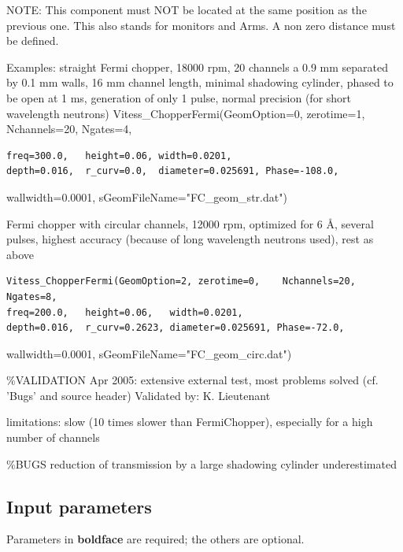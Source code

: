 NOTE: This component must NOT be located at the same position as the previous one. This also stands for monitors and Arms. A non zero distance must be defined.

Examples: straight Fermi chopper, 18000 rpm, 20 channels a 0.9 mm separated by 0.1 mm walls, 16 mm channel length, minimal shadowing cylinder, phased to be open at 1 ms, generation of only 1 pulse, normal precision (for short wavelength neutrons) Vitess\_ChopperFermi(GeomOption=0, zerotime=1, Nchannels=20, Ngates=4,

\begin{verbatim}
freq=300.0,   height=0.06, width=0.0201,
depth=0.016,  r_curv=0.0,  diameter=0.025691, Phase=-108.0,
\end{verbatim}

wallwidth=0.0001, sGeomFileName="FC\_geom\_str.dat")

Fermi chopper with circular channels, 12000 rpm, optimized for 6 \AA{}, several pulses, highest accuracy (because of long wavelength neutrons used), rest as above

\begin{verbatim}
Vitess_ChopperFermi(GeomOption=2, zerotime=0,    Nchannels=20,  Ngates=8,
freq=200.0,   height=0.06,   width=0.0201,
depth=0.016,  r_curv=0.2623, diameter=0.025691, Phase=-72.0,
\end{verbatim}

wallwidth=0.0001, sGeomFileName="FC\_geom\_circ.dat")

\%VALIDATION Apr 2005: extensive external test, most problems solved (cf. 'Bugs' and source header) Validated by: K. Lieutenant

limitations: slow (10 times slower than FermiChopper), especially for a high number of channels

\%BUGS reduction of transmission by a large shadowing cylinder underestimated

\subsection*{Input parameters}
Parameters in \textbf{boldface} are required; the others are optional.

